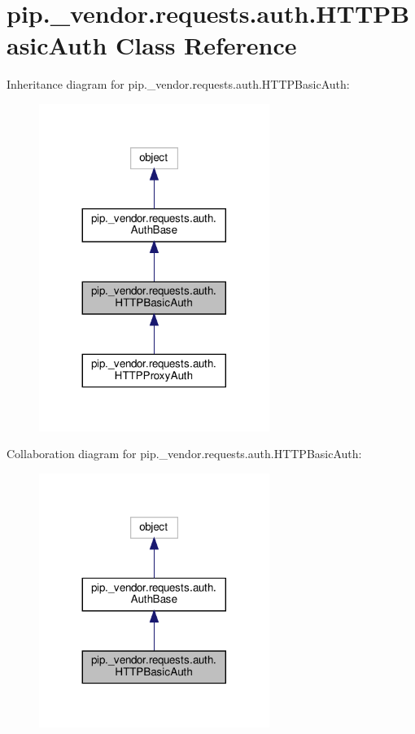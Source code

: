 \hypertarget{classpip_1_1__vendor_1_1requests_1_1auth_1_1HTTPBasicAuth}{}\section{pip.\+\_\+vendor.\+requests.\+auth.\+H\+T\+T\+P\+Basic\+Auth Class Reference}
\label{classpip_1_1__vendor_1_1requests_1_1auth_1_1HTTPBasicAuth}


Inheritance diagram for pip.\+\_\+vendor.\+requests.\+auth.\+H\+T\+T\+P\+Basic\+Auth\+:
\nopagebreak
\begin{figure}[H]
\begin{center}
\leavevmode
\includegraphics[width=212pt]{classpip_1_1__vendor_1_1requests_1_1auth_1_1HTTPBasicAuth__inherit__graph}
\end{center}
\end{figure}


Collaboration diagram for pip.\+\_\+vendor.\+requests.\+auth.\+H\+T\+T\+P\+Basic\+Auth\+:
\nopagebreak
\begin{figure}[H]
\begin{center}
\leavevmode
\includegraphics[width=212pt]{classpip_1_1__vendor_1_1requests_1_1auth_1_1HTTPBasicAuth__coll__graph}
\end{center}
\end{figure}
